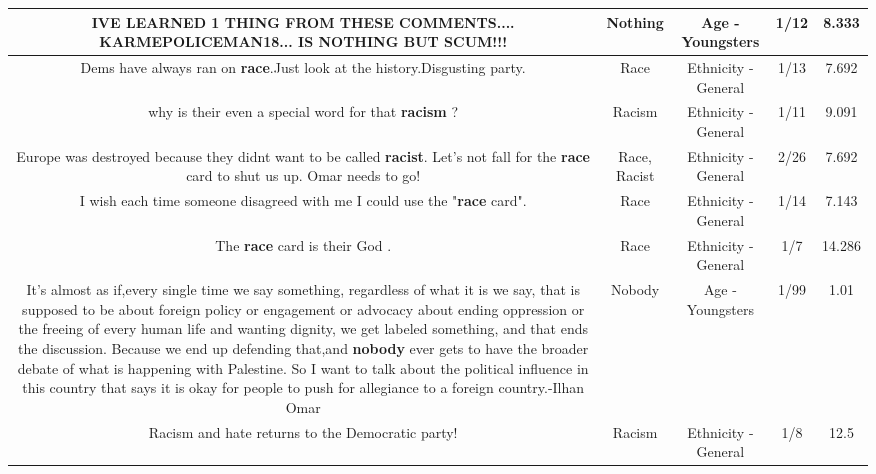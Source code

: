 \documentclass[11pt]{article}
\newlength\mylength
\begin{document}
\begin{center}
\begin{longtable}{|C{.65\mylength}|C{.30\mylength}|C{.12\mylength}|C{.12\mylength}|C{.12\mylength}|}
  \small IVE LEARNED 1 THING FROM THESE COMMENTS.... KARMEPOLICEMAN18...  IS \textbf{NOTHING} BUT SCUM!!!\normalsize   & Nothing & Age - Youngsters & 1/12 & 8.333 \\  \hline
  \small Dems have always ran on \textbf{race}.Just look at the history.Disgusting party.\normalsize   & Race & Ethnicity - General & 1/13 & 7.692 \\  \hline
  \small why is their even a special word for that \textbf{racism} ?\normalsize   & Racism & Ethnicity - General & 1/11 & 9.091 \\  \hline
  \small Europe was destroyed because they didnt want to be called \textbf{racist}.  Let's not fall for the \textbf{race} card to shut us up. Omar needs to go!\normalsize   & Race, Racist & Ethnicity - General & 2/26 & 7.692 \\  \hline
  \small I wish each time someone disagreed with me I could use the "\textbf{race} card".\normalsize   & Race & Ethnicity - General & 1/14 & 7.143 \\  \hline
  \small The \textbf{race} card is their God .\normalsize   & Race & Ethnicity - General & 1/7 & 14.286 \\  \hline
  \small It's almost as if,every single time we say something, regardless of what it is we say, that is supposed to be about foreign policy or engagement or advocacy about ending oppression or the freeing of every human life and wanting dignity, we get labeled something, and that ends the discussion. Because we end up defending that,and \textbf{nobody} ever gets to have the broader debate of what is happening with Palestine. So I want to talk about the political influence in this country that says it is okay for people to push for allegiance to a foreign country.-Ilhan Omar\normalsize   & Nobody & Age - Youngsters & 1/99 & 1.01 \\  \hline
  \small Racism and  hate returns to the Democratic party!\normalsize   & Racism & Ethnicity - General & 1/8 & 12.5 \\  \hline

\end{longtable}
\end{center}
\end{document}
